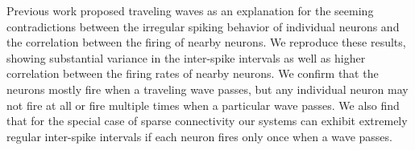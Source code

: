 \documentclass[12pt]{article}
\begin{document}
Previous work \parencite{keane2015} proposed traveling waves as an explanation for the seeming contradictions between the irregular spiking behavior of individual neurons 
and the correlation between the firing of nearby neurons.
We reproduce these results, showing substantial variance in the inter-spike intervals as well as higher correlation between the firing rates of nearby neurons.
We confirm that the neurons mostly fire when a traveling wave passes, but any individual neuron may not fire at all or fire multiple times when a particular wave passes.
We also find that for the special case of sparse connectivity our systems can exhibit extremely regular inter-spike intervals if each neuron fires only once when a wave passes.



\clearpage
\printbibliography
\end{document}
